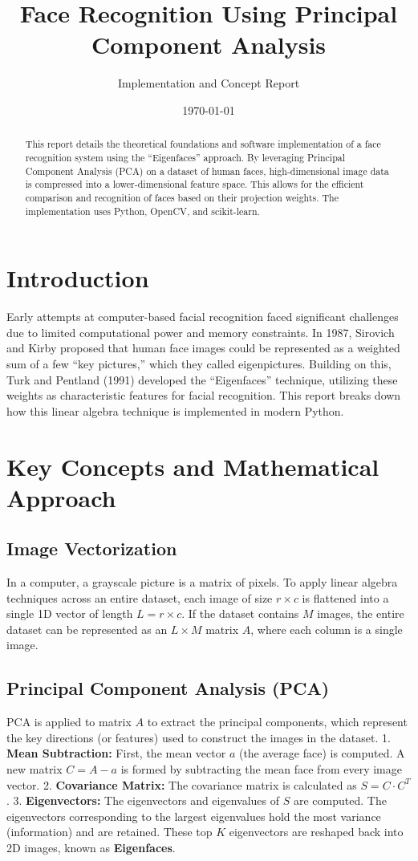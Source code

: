 \documentclass[12pt,a4paper]{article}
\title{\textbf{Face Recognition Using Principal Component Analysis}}
\author{Implementation and Concept Report}
\date{\today}
\begin{document}
\maketitle

\begin{abstract}
This report details the theoretical foundations and software implementation of a face recognition system using the ``Eigenfaces'' approach. By leveraging Principal Component Analysis (PCA) on a dataset of human faces, high-dimensional image data is compressed into a lower-dimensional feature space. This allows for the efficient comparison and recognition of faces based on their projection weights. The implementation uses Python, OpenCV, and scikit-learn.
\end{abstract}

\section{Introduction}
Early attempts at computer-based facial recognition faced significant challenges due to limited computational power and memory constraints. In 1987, Sirovich and Kirby proposed that human face images could be represented as a weighted sum of a few ``key pictures,'' which they called eigenpictures. Building on this, Turk and Pentland (1991) developed the ``Eigenfaces'' technique, utilizing these weights as characteristic features for facial recognition. This report breaks down how this linear algebra technique is implemented in modern Python.

\section{Key Concepts and Mathematical Approach}

\subsection{Image Vectorization}
In a computer, a grayscale picture is a matrix of pixels. To apply linear algebra techniques across an entire dataset, each image of size $r \times c$ is flattened into a single 1D vector of length $L = r \times c$. If the dataset contains $M$ images, the entire dataset can be represented as an $L \times M$ matrix $A$, where each column is a single image.

\subsection{Principal Component Analysis (PCA)}
PCA is applied to matrix $A$ to extract the principal components, which represent the key directions (or features) used to construct the images in the dataset. 
1. \textbf{Mean Subtraction:} First, the mean vector $a$ (the average face) is computed. A new matrix $C = A - a$ is formed by subtracting the mean face from every image vector.
2. \textbf{Covariance Matrix:} The covariance matrix is calculated as $S = C \cdot C^T$.
3. \textbf{Eigenvectors:} The eigenvectors and eigenvalues of $S$ are computed. The eigenvectors corresponding to the largest eigenvalues hold the most variance (information) and are retained. These top $K$ eigenvectors are reshaped back into 2D images, known as \textbf{Eigenfaces}.
\end{document}
